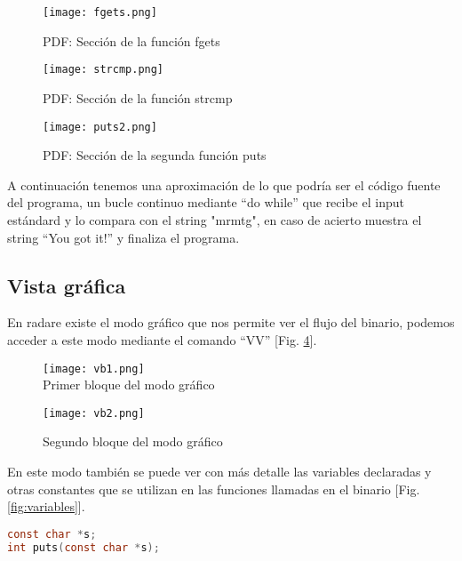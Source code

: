 \documentclass[10pt,a4paper]{article}
\begin{document}
\begin{figure}[h!]
  \centering
  \texttt{[image: fgets.png]}\\
  \caption{PDF: Sección de la función fgets}
  \label{fig:pdf2}
\end{figure}

\begin{figure}[h!]
  \centering
  \texttt{[image: strcmp.png]}\\
  \caption{PDF: Sección de la función strcmp}
  \label{fig:pdf3}
\end{figure}

\begin{figure}[h!]
  \centering
  \texttt{[image: puts2.png]}\\
  \caption{PDF: Sección de la segunda función puts}
  \label{fig:pdf4}
\end{figure}

A continuación tenemos una aproximación de lo que podría ser el código fuente del programa, un bucle continuo mediante ``do while'' que recibe el input estándard y lo compara con el string "mrmtg", en caso de acierto muestra el string ``You got it!'' y finaliza el programa.


\pagebreak

\subsection{Vista gráfica}
En radare existe el modo gráfico que nos permite ver el flujo del binario, podemos acceder a este modo mediante el comando ``VV'' [Fig. \ref{fig:vv}].\\

\begin{figure}[h!]
  \centering
  \texttt{[image: vb1.png]}\\
  \caption{Primer bloque del modo gráfico}
  \vspace{0.3cm}
  \texttt{[image: vb2.png]}\\
  \caption{Segundo bloque del modo gráfico}
  \label{fig:vv}
\end{figure}

\pagebreak

En este modo también se puede ver con más detalle las variables declaradas y otras constantes que se utilizan en las funciones llamadas en el binario [Fig. \ref{fig:variables}].

\pagebreak
\begin{lstlisting}[language=C]
const char *s;
int puts(const char *s);
\end{lstlisting}
\end{document}
